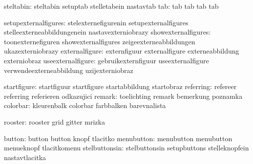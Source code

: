                     steltabin:  steltabin                    setuptab
                                stelletabein                 nastavtab
                          tab:  tab                          tab
                                tab                          tab

         setupexternalfigures:  stelexternefigurenin         setupexternalfigures
                                stelleexterneabbildungenein  nastavexterniobrazy
          showexternalfigures:  toonexternefiguren           showexternalfigures
                                zeigeexterneabbildungen      ukazexterniobrazy
               externalfigure:  externfiguur                 externalfigure
                                externeabbildung             externiobraz
            useexternalfigure:  gebruikexternfiguur          useexternalfigure
                                verwendeexterneabbildung     uzijexterniobraz

                  startfigure:  startfiguur                  startfigure
                                startabbildung               startobraz
                    referring:  refereer                     referring
                                referieren                   odkazujici
                       remark:  toelichting                  remark
                                bemerkung                    poznamka
                     colorbar:  kleurenbalk                  colorbar
                                farbbalken                   barevnalista

                      rooster:  rooster                      grid
                                gitter                       mrizka

                       button:  button                       button
                                knopf                        tlacitko
                   menubutton:  menubutton                   menubutton
                                menueknopf                   tlacitkomenu
                stelbuttonsin:  stelbuttonsin                setupbuttons
                                stelleknopfein               nastavtlacitka

